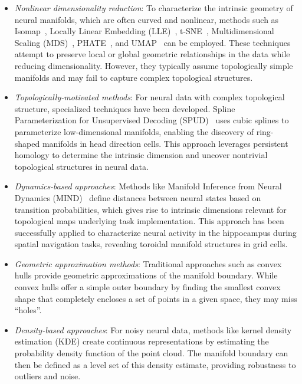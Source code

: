 \documentclass[11pt,a4paper]{article}
\begin{document}
\begin{enumerate}
\begin{itemize}
        \item \textit{Nonlinear dimensionality reduction}: To characterize the intrinsic geometry of neural manifolds, which are often curved and nonlinear, methods such as Isomap~\cite{tenenbaum2000global}, Locally Linear Embedding (LLE)~\cite{roweis2000nonlinear}, t-SNE~\cite{vandermaaten2008visualizing}, Multidimensional Scaling (MDS)~\cite{kruskal1964multidimensional}, PHATE~\cite{moon2019visualizing}, and UMAP~\cite{mcinnes2018umap} can be employed. These techniques attempt to preserve local or global geometric relationships in the data while reducing dimensionality. However, they typically assume topologically simple manifolds and may fail to capture complex topological structures.
        
        \item \textit{Topologically-motivated methods}: For neural data with complex topological structure, specialized techniques have been developed. Spline Parameterization for Unsupervised Decoding (SPUD)~\cite{chaudhuri2019intrinsic} uses cubic splines to parameterize low-dimensional manifolds, enabling the discovery of ring-shaped manifolds in head direction cells. This approach leverages persistent homology to determine the intrinsic dimension and uncover nontrivial topological structures in neural data.
        
        \item \textit{Dynamics-based approaches}: Methods like Manifold Inference from Neural Dynamics (MIND)~\cite{low2018probing} define distances between neural states based on transition probabilities, which gives rise to intrinsic dimensions relevant for topological maps underlying task implementation. This approach has been successfully applied to characterize neural activity in the hippocampus during spatial navigation tasks, revealing toroidal manifold structures in grid cells.
        
        \item \textit{Geometric approximation methods}: Traditional approaches such as convex hulls provide geometric approximations of the manifold boundary. While convex hulls offer a simple outer boundary by finding the smallest convex shape that completely encloses a set of points in a given space, they may miss ``holes''.
        
        \item \textit{Density-based approaches}: For noisy neural data, methods like kernel density estimation (KDE) create continuous representations by estimating the probability density function of the point cloud. The manifold boundary can then be defined as a level set of this density estimate, providing robustness to outliers and noise.
    \end{itemize}
    

\end{enumerate}
\end{document}
